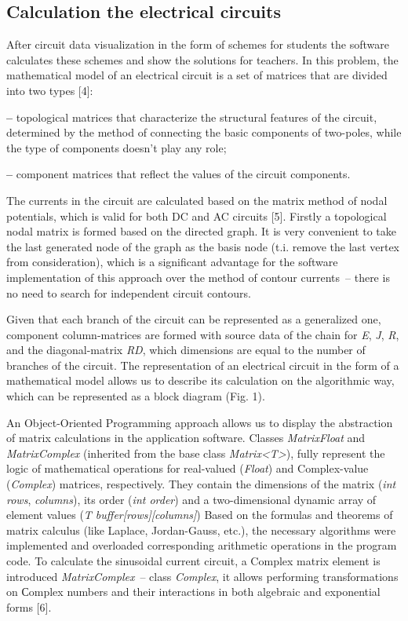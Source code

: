 \documentclass[a4paper,10pt,twoside]{article}
\begin{document}
\begin{multicols}{2}
\section{Calculation the electrical circuits}
After circuit data visualization in the form of schemes for students the software calculates these schemes and show the solutions for teachers. In this problem, the mathematical model of an electrical circuit is a set of matrices that are divided into two types [4]:

\textbf{--} topological matrices that characterize the structural features of the circuit, determined by the method of connecting the basic components of two-poles, while the type of components doesn't play any role;

\textbf{--} component matrices that reflect the values of the circuit components.

The currents in the circuit are calculated based on the matrix method of nodal potentials, which is valid for both DC and AC circuits [5]. 
Firstly a topological nodal matrix is formed based on the directed graph. It is very convenient to take the last generated node of the graph as the basis node (t.i. remove the last vertex from consideration), which is a significant advantage for the software implementation of this approach over the method of contour currents~-- there is no need to search for independent circuit contours.

Given that each branch of the circuit can be represented as a generalized one, component column-matrices are formed with source data of the chain for \textit{E}, \textit{J}, \textit{R}, and the diagonal-matrix \textit{RD}, which dimensions are equal to the number of branches of the circuit. The representation of an electrical circuit in the form of a mathematical model allows us to describe its calculation on the algorithmic way, which can be represented as a block diagram (Fig. 1).


An Object-Oriented Programming approach allows us to display the abstraction of matrix calculations in the application software. Classes \textit{MatrixFloat} and \textit{MatrixComplex} (inherited from the base class \textit{Matrix<T>}), fully represent the logic of mathematical operations for real-valued (\textit{Float}) and Complex-value (\textit{Complex}) matrices, respectively. They contain the dimensions of the matrix (\textit{int rows}, \textit{columns}), its order (\textit{int order}) and a two-dimensional dynamic array of element values (\textit{T buffer[rows][columns]}) Based on the formulas and theorems of matrix calculus (like Laplace, Jordan-Gauss, etc.), the necessary algorithms were implemented and overloaded corresponding arithmetic operations in the program code. To calculate the sinusoidal current circuit, a Complex matrix element is introduced \textit{MatrixComplex}~-- class \textit{Complex}, it allows performing transformations on Сomplex numbers and their interactions in both algebraic and exponential forms [6].


\end{multicols}
\end{document}

